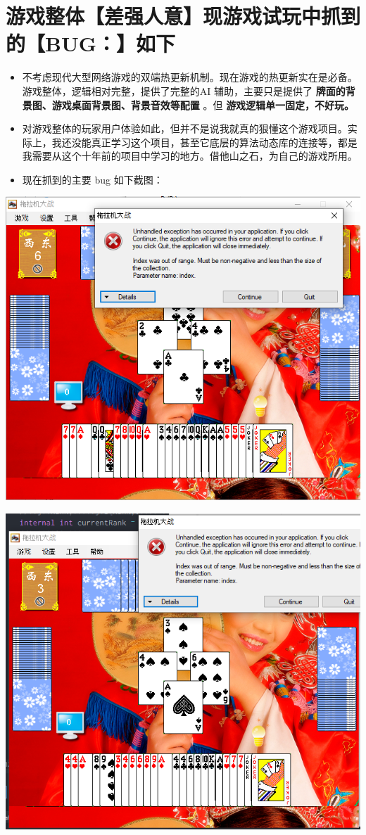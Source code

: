 \documentclass[9pt, b5paper]{article}
\begin{document}
\section{游戏整体【差强人意】现游戏试玩中抓到的【BUG：】如下}
\label{sec:orgddceb69}
\begin{itemize}
\item 不考虑现代大型网络游戏的双端热更新机制。现在游戏的热更新实在是必备。游戏整体，逻辑相对完整，提供了完整的AI 辅助，主要只是提供了 \textbf{牌面的背景图、游戏桌面背景图、背景音效等配置} 。但 \textbf{游戏逻辑单一固定，不好玩。}
\item 对游戏整体的玩家用户体验如此，但并不是说我就真的狠懂这个游戏项目。实际上，我还没能真正学习这个项目，甚至它底层的算法动态库的连接等，都是我需要从这个十年前的项目中学习的地方。借他山之石，为自己的游戏所用。
\item 现在抓到的主要 bug 如下截图：
\end{itemize}

\begin{center}
\includegraphics[width=.9\linewidth]{./pic/readme_20230509_230111.png}
\end{center}

\begin{center}
\includegraphics[width=.9\linewidth]{./pic/readme_20230509_232252.png}
\end{center}
\end{document}
